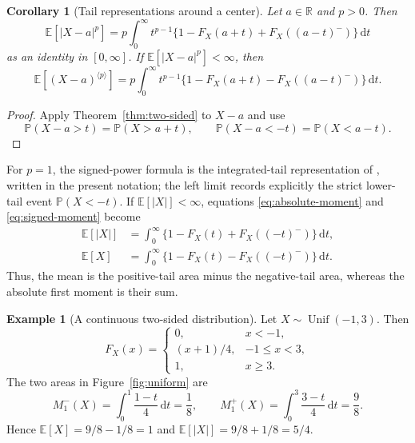 \documentclass[11pt]{article}
\newtheorem{corollary}[theorem]{Corollary}
\theoremstyle{definition}
\newtheorem{example}[theorem]{Example}
\theoremstyle{remark}
\newcommand{\E}{\mathbb{E}}
\newcommand{\Pp}{\mathbb{P}}
\newcommand{\R}{\mathbb{R}}
\newcommand{\dd}{\,\mathrm{d}}
\newcommand{\abs}[1]{\left\lvert #1\right\rvert}
\newcommand{\spow}[2]{#1^{\langle #2\rangle}}
\begin{document}
\begin{corollary}[Tail representations around a center]\label{cor:centered}
Let $a\in\R$ and $p>0$.  Then
\begin{equation}
  \E[\abs{X-a}^p]
  =p\int_0^\infty t^{p-1}
    \{1-F_X(a+t)+F_X((a-t)^-)\}\dd t
  \label{eq:centered-absolute}
\end{equation}
as an identity in $[0,\infty]$.  If $\E[\abs{X-a}^p]<\infty$, then
\begin{equation}
  \E[\spow{(X-a)}{p}]
  =p\int_0^\infty t^{p-1}
    \{1-F_X(a+t)-F_X((a-t)^-)\}\dd t.
  \label{eq:centered-signed}
\end{equation}
\end{corollary}

\begin{proof}
Apply Theorem~\ref{thm:two-sided} to $X-a$ and use
\[
  \Pp(X-a>t)=\Pp(X>a+t),
  \qquad
  \Pp(X-a<-t)=\Pp(X<a-t).
\]
\end{proof}

For $p=1$, the signed-power formula is the integrated-tail representation of
\citet[Proposition~2.1]{Lo2019}, written in the present notation; the left
limit records explicitly the strict lower-tail event $\Pp(X<-t)$.
If $\E[\abs X]<\infty$, equations
\eqref{eq:absolute-moment} and \eqref{eq:signed-moment} become
\begin{align}
  \E[\abs X]
  &=\int_0^\infty\{1-F_X(t)+F_X((-t)^-)\}\dd t,
  \label{eq:mean-absolute}\\
  \E[X]
  &=\int_0^\infty\{1-F_X(t)-F_X((-t)^-)\}\dd t.
  \label{eq:mean-signed}
\end{align}
Thus, the mean is the positive-tail area minus the negative-tail area,
whereas the absolute first moment is their sum.

\begin{example}[A continuous two-sided distribution]\label{ex:uniform}
Let $X\sim\operatorname{Unif}(-1,3)$.  Then
\[
  F_X(x)=
  \begin{cases}
    0, & x<-1,\\
    (x+1)/4, & -1\leq x<3,\\
    1, & x\geq3.
  \end{cases}
\]
The two areas in Figure~\ref{fig:uniform} are
\[
  M_1^-(X)=\int_0^1\frac{1-t}{4}\dd t=\frac18,
  \qquad
  M_1^+(X)=\int_0^3\frac{3-t}{4}\dd t=\frac98.
\]
Hence $\E[X]=9/8-1/8=1$ and $\E[\abs X]=9/8+1/8=5/4$.
\end{example}
\end{document}
